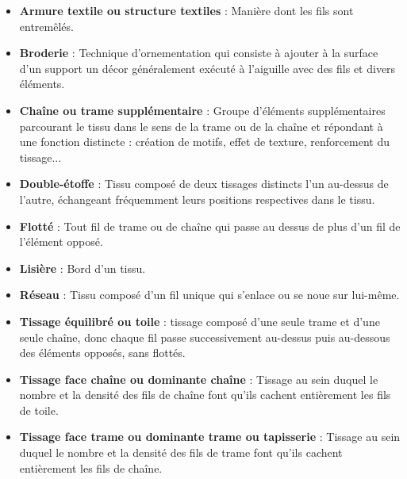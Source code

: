  \begin{itemize}
 	\item \textbf{Armure textile ou structure textiles} : Manière dont les fils sont entremêlés.
	\item \textbf{Broderie} : Technique d'ornementation qui consiste à ajouter à la surface d'un support un décor généralement exécuté à l'aiguille avec des fils et divers éléments.
	\item \textbf{Chaîne ou trame supplémentaire} : Groupe d'éléments supplémentaires parcourant le tissu dans le sens de la trame ou de la chaîne et répondant à une fonction distincte : création de motifs, effet de texture, renforcement du tissage...
	\item \textbf{Double-étoffe} : Tissu composé de deux tissages distincts l'un au-dessus de l'autre, échangeant fréquemment leurs positions respectives dans le tissu.
	\item \textbf{Flotté} : Tout fil de trame ou de chaîne qui passe au dessus de plus d'un fil de l'élément opposé.
	\item \textbf{Lisière} : Bord d'un tissu.
	\item \textbf{Réseau} : Tissu composé d'un fil unique qui s'enlace ou se noue sur lui-même.
	\item \textbf{Tissage équilibré ou toile} : tissage composé d'une seule trame et d'une seule chaîne, donc chaque fil passe successivement au-dessus puis au-dessous des éléments opposés, sans flottés.
	\item \textbf{Tissage face chaîne ou dominante chaîne} : Tissage au sein duquel le nombre et la densité des fils de chaîne font qu'ils cachent entièrement les fils de toile.
	\item \textbf{Tissage face trame ou dominante trame ou tapisserie} : Tissage au sein duquel le nombre et la densité des fils de trame font qu'ils cachent entièrement les fils de chaîne.
\end{itemize}